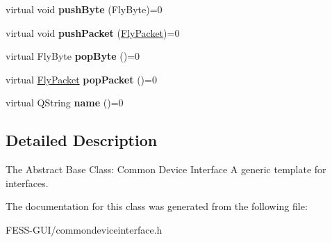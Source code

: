 \begin{DoxyCompactItemize}
virtual void {\bfseries push\+Byte} (Fly\+Byte)=0
\item 
\hypertarget{class_common_device_interface_a682446d40e63ab7e6aa95dae7e0cd83b}{}\label{class_common_device_interface_a682446d40e63ab7e6aa95dae7e0cd83b} 
virtual void {\bfseries push\+Packet} (\hyperlink{class_fly_packet}{Fly\+Packet})=0
\item 
\hypertarget{class_common_device_interface_ab9f57b21f72ebfbf79c86f8d0e4f0654}{}\label{class_common_device_interface_ab9f57b21f72ebfbf79c86f8d0e4f0654} 
virtual Fly\+Byte {\bfseries pop\+Byte} ()=0
\item 
\hypertarget{class_common_device_interface_a1b9c96bffa9af46a054e7ce0c341ea19}{}\label{class_common_device_interface_a1b9c96bffa9af46a054e7ce0c341ea19} 
virtual \hyperlink{class_fly_packet}{Fly\+Packet} {\bfseries pop\+Packet} ()=0
\item 
\hypertarget{class_common_device_interface_a3d80b22eafc88af3109b08491bef6e8a}{}\label{class_common_device_interface_a3d80b22eafc88af3109b08491bef6e8a} 
virtual Q\+String {\bfseries name} ()=0
\end{DoxyCompactItemize}


\subsection{Detailed Description}
The Abstract Base Class\+: Common Device Interface A generic template for interfaces. 

The documentation for this class was generated from the following file\+:\begin{DoxyCompactItemize}
\item 
F\+E\+S\+S-\/\+G\+U\+I/commondeviceinterface.\+h\end{DoxyCompactItemize}

